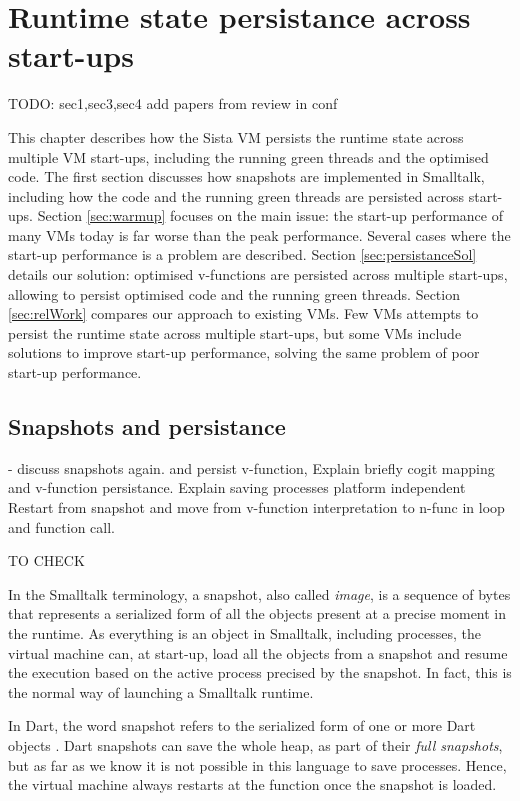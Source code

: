 \documentclass[a4paper,12pt,twoside]{../includes/ThesisStyle}
\begin{document}
\fi

\chapter{Runtime state persistance across start-ups}
\label{chap:persistance}
\minitoc

TODO: sec1,sec3,sec4 add papers from review in conf

This chapter describes how the Sista VM persists the runtime state across multiple VM start-ups, including the running green threads and the optimised code. The first section discusses how snapshots are implemented in Smalltalk, including how the code and the running green threads are persisted across start-ups. Section \ref{sec:warmup} focuses on the main issue: the start-up performance of many VMs today is far worse than the peak performance. Several cases where the start-up performance is a problem are described. Section \ref{sec:persistanceSol} details our solution: optimised v-functions are persisted across multiple start-ups, allowing to persist optimised code and the running green threads. Section \ref{sec:relWork} compares our approach to existing VMs. Few VMs attempts to persist the runtime state across multiple start-ups, but some VMs include solutions to improve start-up performance, solving the same problem of poor start-up performance.

\section{Snapshots and persistance}

- discuss snapshots again. 
and persist v-function, 
Explain briefly cogit mapping and v-function persistance.
Explain saving processes
platform independent
Restart from snapshot and move from v-function interpretation to n-func in loop and function call.

TO CHECK


In the Smalltalk terminology, a snapshot, also called \emph{image}, is a sequence of bytes that represents a serialized form of all the objects present at a precise moment in the runtime. As everything is an object in Smalltalk, including processes, the virtual machine can, at start-up, load all the objects from a snapshot and resume the execution based on the active process precised by the snapshot. In fact, this is the normal way of launching a Smalltalk runtime. 

In Dart, the word snapshot refers to the serialized form of one or more Dart objects \cite{Anna13a}. Dart snapshots can save the whole heap, as part of their \emph{full snapshots}, but as far as we know it is not possible in this language to save processes. Hence, the virtual machine always restarts at the  function once the snapshot is loaded.
\end{document}
